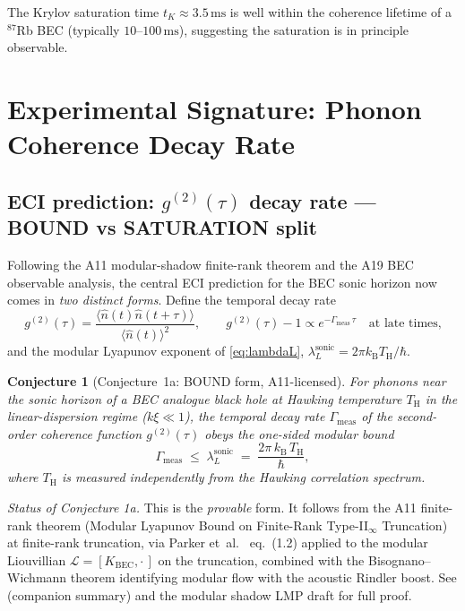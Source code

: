 \documentclass[12pt,a4paper]{article}
\newtheorem{conjecture}{Conjecture}
\renewcommand{\TH}{T_{\mathrm{H}}}
\newcommand{\lambdaL}{\lambda_L^{\mathrm{sonic}}}
\newcommand{\kB}{k_{\mathrm{B}}}
\begin{document}
The Krylov saturation time $t_K \approx 3.5\,\mathrm{ms}$ is well within
the coherence lifetime of a $^{87}$Rb BEC (typically $10$--$100\,\mathrm{ms}$),
suggesting the saturation is in principle observable.

\section{Experimental Signature: Phonon Coherence Decay Rate}
\label{sec:observable}

\subsection{ECI prediction: $g^{(2)}(\tau)$ decay rate
  --- BOUND vs SATURATION split}

Following the A11 modular-shadow finite-rank theorem
\cite{eci_modular_shadow_summary} and the A19 BEC observable analysis,
the central ECI prediction for the BEC sonic horizon now comes in
\emph{two distinct forms}.  Define the temporal decay rate
\begin{equation}
  g^{(2)}(\tau) = \frac{\langle\hat{n}(t)\hat{n}(t+\tau)\rangle}
    {\langle\hat{n}(t)\rangle^2},
  \qquad
  g^{(2)}(\tau) - 1 \propto e^{-\Gamma_{\mathrm{meas}}\,\tau}
  \quad\text{at late times,}
\end{equation}
and the modular Lyapunov exponent of \eqref{eq:lambdaL},
$\lambdaL = 2\pi\kB\TH/\hbar$.

\begin{conjecture}[Conjecture~1a: BOUND form, A11-licensed]
\label{conj:1a-bound}
For phonons near the sonic horizon of a BEC analogue black hole at
Hawking temperature $\TH$ in the linear-dispersion regime
($k\xi \ll 1$), the temporal decay rate $\Gamma_{\mathrm{meas}}$ of
the second-order coherence function $g^{(2)}(\tau)$ obeys the
\emph{one-sided modular bound}
\begin{equation}
  \boxed{\Gamma_{\mathrm{meas}} \;\leq\; \lambdaL
    \;=\; \frac{2\pi\,\kB\,\TH}{\hbar},}
  \label{eq:bound-conjecture}
\end{equation}
where $\TH$ is measured \emph{independently} from the Hawking
correlation spectrum.
\end{conjecture}

\noindent\emph{Status of Conjecture 1a.}
This is the \emph{provable} form.  It follows from the A11 finite-rank
theorem (Modular Lyapunov Bound on Finite-Rank Type-II$_\infty$
Truncation) at finite-rank truncation, via Parker
et~al.~\cite{parker2019} eq.~(1.2) applied to the modular Liouvillian
$\mathcal{L} = [K_{\mathrm{BEC}}, \cdot\,]$ on the truncation, combined
with the Bisognano--Wichmann theorem identifying modular flow with the
acoustic Rindler boost.  See
\cite{eci_modular_shadow_summary} (companion summary) and the
modular shadow LMP draft for full proof.
\end{document}
